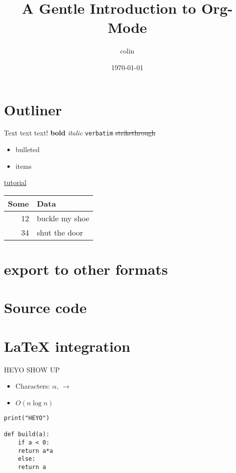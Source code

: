 \documentclass[11pt]{article}
\author{colin}
\date{\today}
\title{A Gentle Introduction to Org-Mode}
\begin{document}
\maketitle
\section{Outliner}
\label{sec:orgcac2d26}

Text text text!
\textbf{bold} \emph{italic} \texttt{verbatim} \sout{strikethrough}

\begin{itemize}
\item bulleted
\item items
\end{itemize}

\href{https://www.youtube.com/watch?v=SzA2YODtgK4}{tutorial}

\begin{center}
\begin{tabular}{rl}
Some & Data\\
\hline
12 & buckle my shoe\\
34 & shut the door\\
\end{tabular}
\end{center}

\section{export to other formats}
\label{sec:orgbe667e3}

\section{Source code}
\label{sec:orge92654c}

\section{\LaTeX{} integration}
\label{sec:org2e5a764}
HEYO SHOW UP
\begin{itemize}
\item Characters: \(\alpha\), \(\rightarrow\)
\item \(O(n \log n)\)
\end{itemize}

\begin{verbatim}
print("HEYO")

def build(a):
    if a < 0:
	return a*a
    else:
	return a

\end{verbatim}
\end{document}
